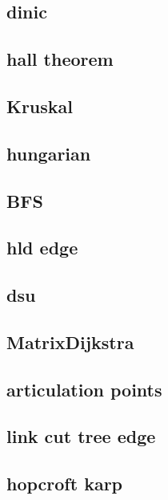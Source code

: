 \subsection{dinic}
\raggedbottom
\hrulefill
\subsection{hall theorem}
\raggedbottom
\hrulefill
\subsection{Kruskal}
\raggedbottom
\hrulefill
\subsection{hungarian}
\raggedbottom
\hrulefill
\subsection{BFS}
\raggedbottom
\hrulefill
\subsection{hld edge}
\raggedbottom
\hrulefill
\subsection{dsu}
\raggedbottom
\hrulefill
\subsection{MatrixDijkstra}
\raggedbottom
\hrulefill
\subsection{articulation points}
\raggedbottom
\hrulefill
\subsection{link cut tree edge}
\raggedbottom
\hrulefill
\subsection{hopcroft karp}
\raggedbottom
\hrulefill
